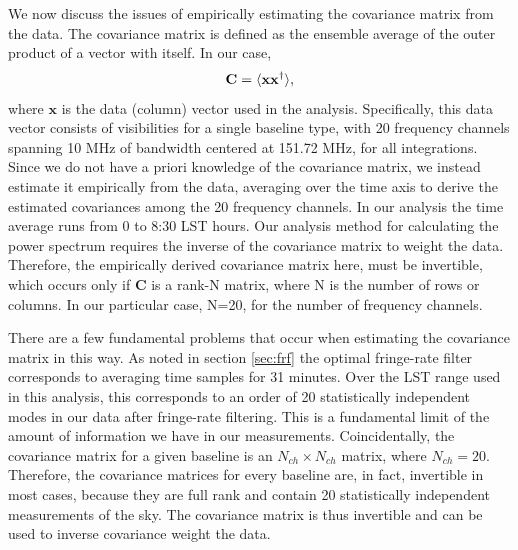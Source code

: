 \documentclass[twocolumn,numberedappendix]{emulateapj} \shorttitle{PSA64}
\newcommand{\x}{\mathbf{x}} \newcommand{\xhat}{\hat{\mathbf{x}}}
\newcommand{\C}{\mathbf{C}} \newcommand{\Q}{\mathbf{Q}}
\begin{document}
We now discuss the issues of empirically estimating the covariance matrix from
the data. The covariance matrix is defined as the ensemble average of the outer
product of a vector with itself. In our case, 
\begin{equation}
    \C = \expval{\x\x^{\dagger}}, 
\end{equation}
where $\x$ is the data (column) vector used in the analysis. Specifically, this data
vector consists of visibilities for a single baseline type, with 20 frequency
channels spanning 10 MHz of bandwidth
centered at 151.72 MHz, for all integrations.
Since we do not have a priori knowledge of the covariance matrix, 
we instead estimate it empirically from the data, averaging over the time
axis to derive the estimated covariances among the 20 frequency channels. In our
analysis the time average runs from 0 to 8:30 LST hours. Our analysis method
for calculating the power spectrum requires the inverse of the covariance
matrix to weight the data. Therefore, the empirically derived covariance matrix
here, must be invertible, which occurs only if $\C$ is a rank-N matrix, where N
is the number of rows or columns. In our particular case, N=20, for the number of frequency channels.

There are a few fundamental problems that occur when estimating the covariance
matrix in this way. As noted in section \ref{sec:frf} the optimal fringe-rate
filter corresponds to averaging time samples for 31 minutes. Over the LST range
used in this analysis, this corresponds to an order of 20 statistically
independent modes in our data after fringe-rate filtering. This is a fundamental
limit of the amount of information we have in our measurements. Coincidentally,
the covariance matrix for a given baseline is an $N_{ch} \times N_{ch}$ matrix,
where $N_{ch}=20$.  Therefore, the covariance matrices for every baseline are,
in fact, invertible in most cases,  because they are full rank and contain 20
statistically independent measurements of the sky. The covariance matrix is thus
invertible and can be used to inverse covariance weight the data.
\end{document}
